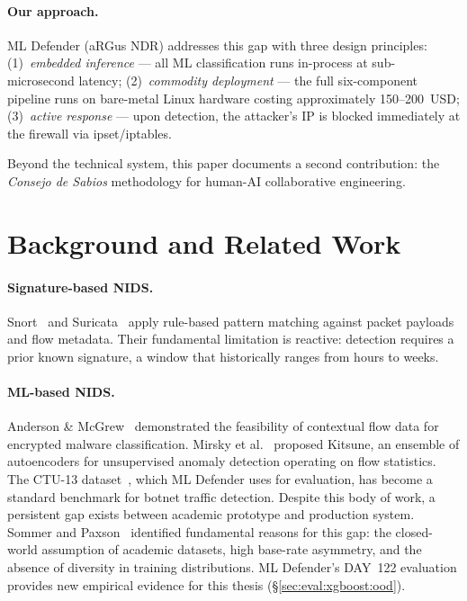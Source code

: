 \documentclass[11pt,a4paper]{article}
\begin{document}
    \paragraph{Our approach.}
    ML Defender (aRGus NDR) addresses this gap with three design principles:
    (1)~\emph{embedded inference} --- all ML classification runs in-process at sub-microsecond
    latency;
    (2)~\emph{commodity deployment} --- the full six-component pipeline runs on bare-metal Linux
    hardware costing approximately 150--200~USD;
    (3)~\emph{active response} --- upon detection, the attacker's IP is blocked immediately at
    the firewall via ipset/iptables.

    Beyond the technical system, this paper documents a second contribution: the \emph{Consejo
    de Sabios} methodology for human-AI collaborative engineering.

    \section{Background and Related Work}

    \paragraph{Signature-based NIDS.}
    Snort~\cite{roesch1999} and Suricata~\cite{oisf2010} apply rule-based pattern matching
    against packet payloads and flow metadata. Their fundamental limitation is reactive:
    detection requires a prior known signature, a window that historically ranges from hours to
    weeks.

    \paragraph{ML-based NIDS.}
    Anderson \& McGrew~\cite{anderson2016} demonstrated the feasibility of contextual flow data
    for encrypted malware classification. Mirsky et al.~\cite{mirsky2018} proposed Kitsune, an
    ensemble of autoencoders for unsupervised anomaly detection operating on flow statistics. The
    CTU-13 dataset~\cite{garcia2014}, which ML Defender uses for evaluation, has become a
    standard benchmark for botnet traffic detection. Despite this body of work, a persistent gap
    exists between academic prototype and production system. Sommer and Paxson~\cite{sommer2010}
    identified fundamental reasons for this gap: the closed-world assumption of academic datasets,
    high base-rate asymmetry, and the absence of diversity in training distributions. ML Defender's
    DAY~122 evaluation provides new empirical evidence for this thesis
    (\S\ref{sec:eval:xgboost:ood}).
\end{document}
